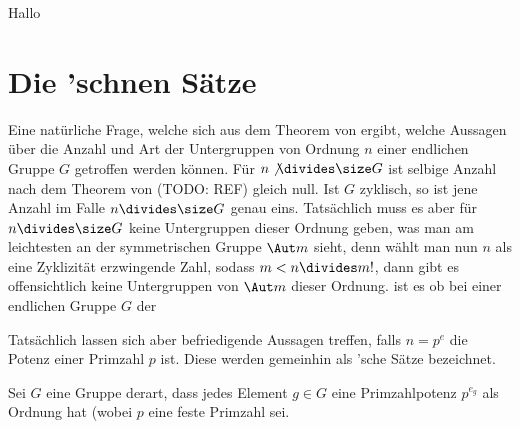 \begin{theorem}
    Hallo
\end{theorem}

\section{Die 'schnen Sätze}

Eine natürliche Frage, welche sich aus dem Theorem von  ergibt, welche Aussagen über die Anzahl und Art der
Untergruppen von Ordnung $n$ einer endlichen Gruppe $G$ getroffen werden können.
Für $n\not\divides \size G$ ist selbige Anzahl nach dem Theorem von  (TODO: REF) gleich null. Ist $G$ zyklisch, so
ist jene Anzahl im Falle $n\divides \size G$ genau eins. Tatsächlich muss es aber für $n\divides \size G$ keine Untergruppen dieser
Ordnung geben, was man am leichtesten an der symmetrischen Gruppe $\Aut m$ sieht, denn wählt man nun $n$ als eine Zyklizität
erzwingende Zahl, sodass $m<n\divides m!$, dann gibt es offensichtlich keine Untergruppen von $\Aut m$ dieser Ordnung.
ist es ob bei einer endlichen Gruppe $G$ der

Tatsächlich lassen sich aber befriedigende Aussagen treffen, falls $n=p^e$ die Potenz einer Primzahl $p$ ist. Diese werden
gemeinhin als 'sche Sätze bezeichnet.

\begin{definition}[$p$-Gruppe]
    Sei $G$ eine Gruppe derart, dass jedes Element $g\in G$ eine Primzahlpotenz $p^{e_g}$ als Ordnung hat (wobei $p$ eine feste
    Primzahl sei.
\end{definition}

